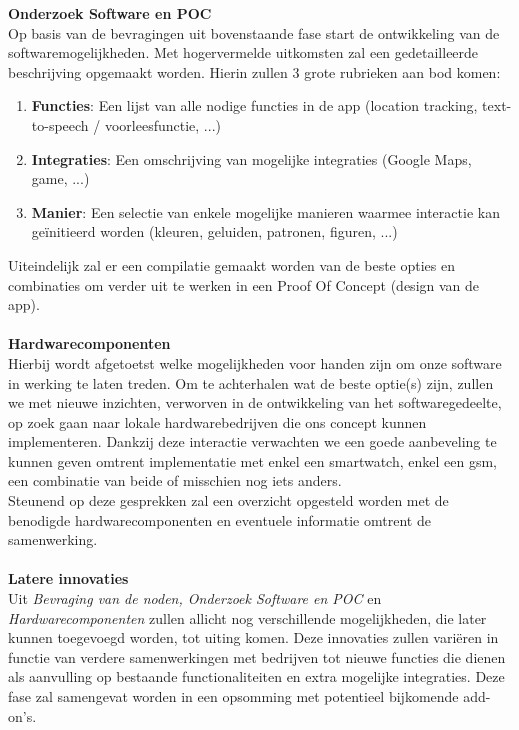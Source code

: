 \documentclass{hogent-article}
\begin{document}
    \textbf{Onderzoek Software en POC} \\
    Op basis van de bevragingen uit bovenstaande fase start de ontwikkeling van de softwaremogelijkheden. Met hogervermelde uitkomsten zal een gedetailleerde beschrijving opgemaakt worden. Hierin zullen 3 grote rubrieken aan bod komen:
    \begin{enumerate}
        \item \textbf{Functies}: Een lijst van alle nodige functies in de app (location tracking, text-to-speech / voorleesfunctie, ...)
        \item \textbf{Integraties}: Een omschrijving van mogelijke integraties (Google Maps, game, ...)
        \item \textbf{Manier}: Een selectie van enkele mogelijke manieren waarmee interactie kan geïnitieerd worden (kleuren, geluiden, patronen, figuren, ...)
    \end{enumerate}
    Uiteindelijk zal er een compilatie gemaakt worden van de beste opties en combinaties om verder uit te werken in een Proof Of Concept (design van de app). \\\\
    
    \textbf{Hardwarecomponenten} \\
    Hierbij wordt afgetoetst welke mogelijkheden voor handen zijn om onze software in werking te laten treden. Om te achterhalen wat de beste optie(s) zijn, zullen we met nieuwe inzichten, verworven in de ontwikkeling van het softwaregedeelte, op zoek gaan naar lokale hardwarebedrijven die ons concept kunnen implementeren. Dankzij deze interactie verwachten we een goede aanbeveling te kunnen geven omtrent implementatie met enkel een smartwatch, enkel een gsm, een combinatie van beide of misschien nog iets anders. \\
    Steunend op deze gesprekken zal een overzicht opgesteld worden met de benodigde hardwarecomponenten en eventuele informatie omtrent de samenwerking. \\\\
    
    \textbf{Latere innovaties} \\
    Uit \emph{Bevraging van de noden, Onderzoek Software en POC} en \emph{Hardwarecomponenten} zullen allicht nog verschillende mogelijkheden, die later kunnen toegevoegd worden, tot uiting komen. Deze innovaties zullen variëren in functie van verdere samenwerkingen met bedrijven tot nieuwe functies die dienen als aanvulling op bestaande functionaliteiten en extra mogelijke integraties. Deze fase zal samengevat worden in een opsomming met potentieel bijkomende add-on's.
    
\end{document}
